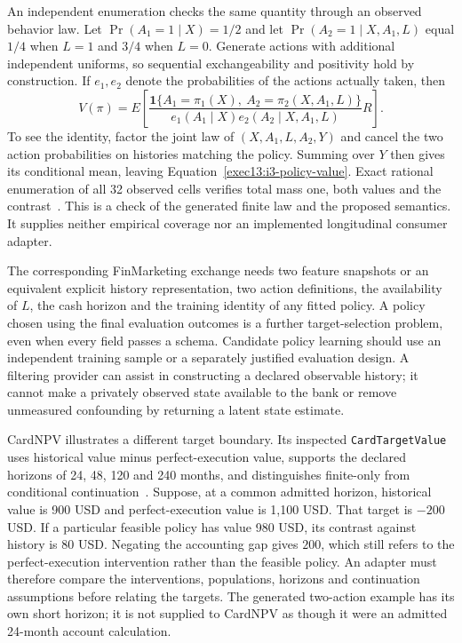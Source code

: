 An independent enumeration checks the same quantity through an observed
behavior law. Let $\Pr(A_1=1\mid X)=1/2$ and let
$\Pr(A_2=1\mid X,A_1,L)$ equal $1/4$ when $L=1$ and $3/4$ when
$L=0$. Generate actions with additional independent uniforms, so sequential
exchangeability and positivity hold by construction. If $e_1,e_2$ denote
the probabilities of the actions actually taken, then
\begin{equation}
 V(\pi)=E\left[
  \frac{\mathbf1\{A_1=\pi_1(X),\ A_2=\pi_2(X,A_1,L)\}}
       {e_1(A_1\mid X)e_2(A_2\mid X,A_1,L)}R\right].
 \label{exec13:i3-policy-ipw}
\end{equation}
To see the identity, factor the joint law of $(X,A_1,L,A_2,Y)$ and cancel
the two action probabilities on histories matching the policy. Summing over
$Y$ then gives its conditional mean, leaving
Equation~\eqref{exec13:i3-policy-value}. Exact rational enumeration of all
32 observed cells verifies total mass one, both values and the contrast~\citep{exec13_i3_examples}. This is a check of the generated finite law and
the proposed semantics. It supplies neither empirical coverage nor an
implemented longitudinal consumer adapter.

The corresponding FinMarketing exchange needs two feature snapshots or an
equivalent explicit history representation, two action definitions, the
availability of $L$, the cash horizon and the training identity of any fitted
policy. A policy chosen using the final evaluation outcomes is a further
target-selection problem, even when every field passes a schema. Candidate
policy learning should use an independent training sample or a separately
justified evaluation design. A filtering provider can assist in constructing
a declared observable history; it cannot make a privately observed state
available to the bank or remove unmeasured confounding by returning a latent
state estimate.

CardNPV illustrates a different target boundary. Its inspected
\texttt{CardTargetValue} uses historical value minus perfect-execution
value, supports the declared horizons of 24, 48, 120 and 240 months, and
distinguishes finite-only from conditional continuation~\citep{exec13_i3_inspection}.
Suppose, at a common admitted horizon, historical value is 900 USD and
perfect-execution value is 1,100 USD. That target is $-200$ USD. If a
particular feasible policy has value 980 USD, its contrast against history
is $80$ USD. Negating the accounting gap gives $200$, which still refers
to the perfect-execution intervention rather than the feasible policy.
An adapter must therefore compare the interventions, populations, horizons
and continuation assumptions before relating the targets. The generated
two-action example has its own short horizon; it is not supplied to CardNPV
as though it were an admitted 24-month account calculation.

